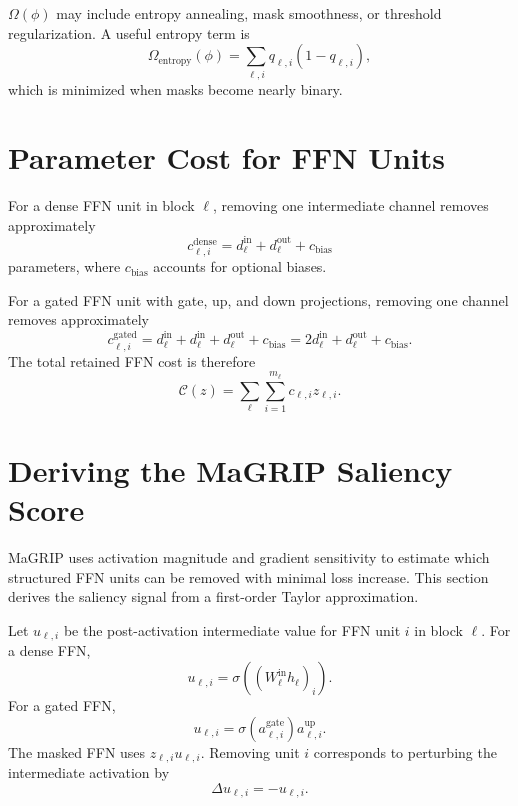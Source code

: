 \documentclass[11pt]{article}
\newcommand{\Cost}{\mathcal{C}}
\begin{document}
$\Omega(\phi)$ may include entropy annealing, mask smoothness, or threshold regularization. A useful entropy term is
\begin{equation}
  \Omega_{\mathrm{entropy}}(\phi)
  =
  \sum_{\ell,i}
  q_{\ell,i}(1-q_{\ell,i}),
\end{equation}
which is minimized when masks become nearly binary.

\section{Parameter Cost for FFN Units}

For a dense FFN unit in block $\ell$, removing one intermediate channel removes approximately
\begin{equation}
  c_{\ell,i}^{\mathrm{dense}}
  =
  d_{\ell}^{\mathrm{in}} + d_{\ell}^{\mathrm{out}}
  +
  c_{\mathrm{bias}}
\end{equation}
parameters, where $c_{\mathrm{bias}}$ accounts for optional biases.

For a gated FFN unit with gate, up, and down projections, removing one channel removes approximately
\begin{equation}
  c_{\ell,i}^{\mathrm{gated}}
  =
  d_{\ell}^{\mathrm{in}}
  +
  d_{\ell}^{\mathrm{in}}
  +
  d_{\ell}^{\mathrm{out}}
  +
  c_{\mathrm{bias}}
  =
  2d_{\ell}^{\mathrm{in}} + d_{\ell}^{\mathrm{out}} + c_{\mathrm{bias}}.
  \label{eq:gated-unit-cost}
\end{equation}
The total retained FFN cost is therefore
\begin{equation}
  \Cost(z)
  =
  \sum_{\ell}
  \sum_{i=1}^{m_{\ell}}
  c_{\ell,i}z_{\ell,i}.
\end{equation}

\section{Deriving the MaGRIP Saliency Score}

MaGRIP uses activation magnitude and gradient sensitivity to estimate which structured FFN units can be removed with minimal loss increase. This section derives the saliency signal from a first-order Taylor approximation.

Let $u_{\ell,i}$ be the post-activation intermediate value for FFN unit $i$ in block $\ell$. For a dense FFN,
\begin{equation}
  u_{\ell,i}
  =
  \sigma\!\left((W_{\ell}^{\mathrm{in}}h_{\ell})_i\right).
\end{equation}
For a gated FFN,
\begin{equation}
  u_{\ell,i}
  =
  \sigma(a_{\ell,i}^{\mathrm{gate}})
  a_{\ell,i}^{\mathrm{up}}.
\end{equation}
The masked FFN uses $z_{\ell,i}u_{\ell,i}$. Removing unit $i$ corresponds to perturbing the intermediate activation by
\begin{equation}
  \Delta u_{\ell,i}
  =
  -u_{\ell,i}.
\end{equation}
\end{document}
